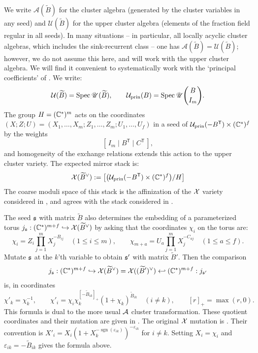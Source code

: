 \documentclass[12pt, letter]{amsart}
\theoremstyle{definition}
\newcommand{\U}{\mathscr U}
\newcommand{\pr}{\mathrm{prin}}
\numberwithin{equation}{section}
\begin{document}
We write $\mathscr{A}(\widetilde B)$ for the cluster algebra (generated by the cluster variables in any seed) and $\mathscr{U}(\widetilde B)$ for the upper cluster algebra (elements of the fraction field  regular in all seeds).  In many situations -- in particular, all locally acyclic cluster algebras, which includes the sink-recurrent class -- one has $\mathscr{A}(\widetilde B) = \mathscr{U}(\widetilde B)$; however, we do not assume this here, and will work with the upper cluster algebra.  We will find it convenient to systematically work with the `principal coefficients' of \cite{FZ-IV}.  We write:
\[
 \mathcal{U}(\widetilde B)=\Spec\U(\widetilde B),\qquad
 \mathcal{U}_{\pr}(B)=\Spec\U\binom B{I_m}.
\]
The group $H=(\mathbb C^*)^m$ acts on the coordinates $(X;Z;U) = (X_1,\ldots,X_m;Z_1,\ldots,Z_m;U_1,\ldots,U_f)$ 
in a seed of $\mathcal{U}_\pr(-B^{\mathsf T})\times(\C^*)^f$ by the weights
\begin{equation}\label{eq:weights}
 [\,I_m\mid B^{\mathsf T}\mid C^{\mathsf T}\,],
\end{equation}
and homogeneity of the exchange relations extends this action to the upper
cluster variety.  The expected mirror stack is:
\begin{equation}\label{eq:mirror}
  \mathcal{X}(\widetilde B^\vee)
 :=\left[
   \bigl(\mathcal{U}_{\pr}(-B^{\mathsf T})\times(\C^*)^f\bigr)/H
  \right]
\end{equation}
The coarse moduli space of this stack is the affinization of the $\mathcal{X}$ variety considered in \cite{FG09, FG, GHK, GHKK}, and agrees with the stack considered in \cite{Goncharov-Shen}. 

The seed $\mathfrak{s}$ with matrix $\widetilde B$ also determines the embedding of a parameterized torus $j_{\mathfrak{s}}: (\mathbb C^*)^{m+f} \hookrightarrow \mathcal{X}(\widetilde{B}^\vee)$ by asking that the coordinates $\chi_i$ on the torus are:
\begin{equation} \label{eq: x variables}
 \chi_i=Z_i\prod_{j=1}^mX_j^{-B_{ij}}\quad(1\le i\le m),\qquad
 \chi_{m+a}=U_a\prod_{j=1}^mX_j^{-C_{aj}}\quad(1\le a\le f).
\end{equation}
Mutate $\mathfrak{s}$ at the $k$'th variable to obtain $\mathfrak{s}'$ with matrix $\widetilde B'$. Then the comparison
$$j_{\mathfrak{s}}: (\mathbb C^*)^{m+f} \hookrightarrow \mathcal{X}(\widetilde{B}^\vee) = \mathcal{X}((\widetilde{B}')^\vee) \hookleftarrow  (\mathbb C^*)^{m+f} :j_{\mathfrak{s}'}$$
is, in coordinates 
\[
 \chi'_k=\chi_k^{-1},\qquad
 \chi'_i=\chi_i\chi_k^{[-\widetilde B_{ik}]_+}
                    (1+\chi_k)^{\widetilde B_{ik}}\quad(i\ne k),
 \qquad [r]_+=\max(r,0).
\]
This formula is  dual to the more usual $\mathcal{A}$ cluster transformation.
These quotient coordinates and their mutation are given in
\cite[Section~3.6, equations~(25) and~(28)]{HS}. 
The original $\mathcal{X}$ mutation is \cite[Section~1.2, equation~(13)]{FG09}.
Their convention is
$X'_i=X_i(1+X_k^{-\operatorname{sgn}(\varepsilon_{ik})})^{-\varepsilon_{ik}}$
for $i\ne k$. Setting $X_i=\chi_i$ and
$\varepsilon_{ik}=-\widetilde B_{ik}$ gives the formula above.
\end{document}
